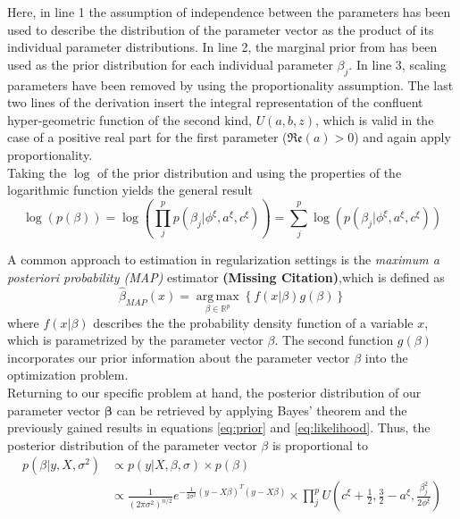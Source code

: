 \documentclass[12pt,a4paper]{article}
\DeclareMathOperator*{\argmax}{arg\,max}
\newcommand{\MC}{\textbf{(Missing Citation)}} %
\begin{document}
Here, in line 1 the assumption of independence between the parameters has been used to describe the distribution of the parameter vector as the product of its individual parameter distributions. In line 2, the marginal prior from \textcite{TGP2020} has been used as the prior distribution for each individual parameter $\beta_j$. In line 3, scaling parameters have been removed by using the proportionality assumption. The last two lines of the derivation insert the integral representation of the confluent hyper-geometric function of the second kind, $U(a,b,z)$, which is valid in the case of a positive real part for the first parameter ($\mathfrak{Re}(a) > 0$) and again apply proportionality.\\

Taking the $\log$ of the prior distribution and using the properties of the logarithmic function yields the general result
\[
\log(p(\beta))=\log(\prod_j^p p(\beta_j|\phi^\xi, a^\xi, c^\xi))=\sum_j^p \log(p(\beta_j|\phi^\xi, a^\xi, c^\xi))
\]

A common approach to estimation in regularization settings is the \textit{maximum a posteriori probability (MAP)} estimator \MC ,which is defined as
\[
\hat{\beta}_{MAP}(x) = \underset{\beta \in \mathbb{R}^p}{\argmax}\left\{f(x|\beta)g(\beta)\right\}
\]
where $f(x|\beta)$ describes the the probability density function of a variable $x$, which is parametrized by the parameter vector $\beta$. The second function $g(\beta)$ incorporates our prior information about the parameter vector $\beta$ into the optimization problem.\\  

Returning to our specific problem at hand, the posterior distribution of our parameter vector $\mathbf{\beta}$ can be retrieved by applying Bayes' theorem and the previously gained results in equations \ref{eq:prior} and \ref{eq:likelihood}. Thus, the posterior distribution of the parameter vector $\beta$ is proportional to
\begin{align}
p(\beta|y, X, \sigma^2) 	&\propto p(y|X,\beta,\sigma)\times p(\beta) \nonumber\\
						&\propto \frac{1}{(2\pi\sigma^2)^{n/2}}e^{-\frac{1}{2\sigma^2}(y-X\beta)^T(y-X\beta)} \times \prod_j^p U\left(c^\xi + \frac{1}{2}, \frac{3}{2}-a^\xi, \frac{\beta_j^2}{2\phi^\xi}\right)\label{eq:posterior}
\end{align} 
\end{document}
